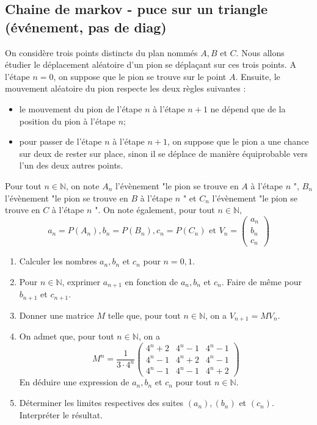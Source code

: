 \subsection{Chaine de markov - puce sur un triangle (événement, pas de diag)}




\begin{exercice}

On considère trois points distincts du plan nommés $A, B$ et $C$. Nous allons étudier le déplacement aléatoire d'un pion se déplaçant sur ces trois points. A l'étape $n=0$, on suppose que le pion se trouve sur le point $A$. Ensuite, le mouvement aléatoire du pion respecte les deux règles suivantes :
\begin{itemize}
\item  le mouvement du pion de l'étape $n$ à l'étape $n+1$ ne dépend que de la position du pion à l'étape $n$;
\item pour passer de l'étape $n$ à l'étape $n+1$, on suppose que le pion a une chance sur deux de rester sur place, sinon il se déplace de manière équiprobable vers l'un des deux autres points.

\end{itemize}

Pour tout $n \in \mathbb{N}$, on note $A_{n}$ l'évènement "le pion se trouve en $A$ à l'étape $n$ ", $B_{n}$ l'évènement "le pion se trouve en $B$ à l'étape $n$ " et $C_{n}$ l'évènement "le pion se trouve en $C$ à l'étape $n$ ". On note également, pour tout $n \in \mathbb{N}$,
$$
a_{n}=P\left(A_{n}\right), b_{n}=P\left(B_{n}\right), c_{n}=P\left(C_{n}\right) \text { et } V_{n}=\left(\begin{array}{l}
a_{n} \\
b_{n} \\
c_{n}
\end{array}\right)
$$
\begin{enumerate}
\item  Calculer les nombres $a_{n}, b_{n}$ et $c_{n}$ pour $n=0,1$.
\item  Pour $n \in \mathbb{N}$, exprimer $a_{n+1}$ en fonction de $a_{n}, b_{n}$ et $c_{n} .$ Faire de même pour $b_{n+1}$ et $c_{n+1}$.
\item  Donner une matrice $M$ telle que, pour tout $n \in \mathbb{N}$, on a $V_{n+1}=M V_{n}$.
\item  On admet que, pour tout $n \in \mathbb{N}$, on a
$$
M^{n}=\frac{1}{3 \cdot 4^{n}}\left(\begin{array}{ccc}
4^{n}+2 & 4^{n}-1 & 4^{n}-1 \\
4^{n}-1 & 4^{n}+2 & 4^{n}-1 \\
4^{n}-1 & 4^{n}-1 & 4^{n}+2
\end{array}\right)
$$
En déduire une expression de $a_{n}, b_{n}$ et $c_{n}$ pour tout $n \in \mathbb{N}$.
\item  Déterminer les limites respectives des suites $\left(a_{n}\right),\left(b_{n}\right)$ et $\left(c_{n}\right)$. Interpréter le résultat.
\end{enumerate}


\end{exercice}



